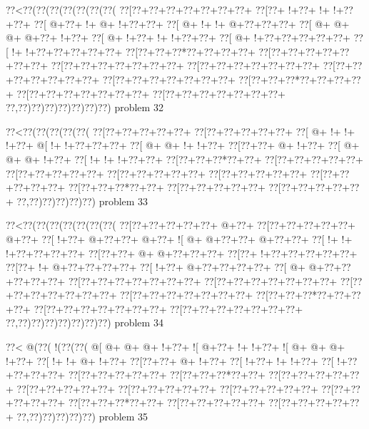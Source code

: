 \vbox{\vbox{\goo
\0??<\0??(\0??(\0??(\0??(\0??(\0??(\0??(
\0??[\0??+\0??+\0??+\0??+\0??+\0??+\0??+
\0??[\0??+\- !+\0??+\- !+\- !+\0??+\0??+
\0??[\- @+\0??+\- !+\- @+\- !+\0??+\0??+
\0??[\- @+\- !+\- !+\- @+\0??+\0??+\0??+
\0??[\- @+\- @+\- @+\- @+\0??+\- !+\0??+
\0??[\- @+\- !+\0??+\- !+\- !+\0??+\0??+
\0??[\- @+\- !+\0??+\0??+\0??+\0??+\0??+
\0??[\- !+\- !+\0??+\0??+\0??+\0??+\0??+
\0??[\0??+\0??+\0??*\0??+\0??+\0??+\0??+
\0??[\0??+\0??+\0??+\0??+\0??+\0??+\0??+
\0??[\0??+\0??+\0??+\0??+\0??+\0??+\0??+
\0??[\0??+\0??+\0??+\0??+\0??+\0??+\0??+
\0??[\0??+\0??+\0??+\0??+\0??+\0??+\0??+
\0??[\0??+\0??+\0??+\0??+\0??+\0??+\0??+
\0??[\0??+\0??+\0??*\0??+\0??+\0??+\0??+
\0??[\0??+\0??+\0??+\0??+\0??+\0??+\0??+
\0??[\0??+\0??+\0??+\0??+\0??+\0??+\0??+
\0??,\0??)\0??)\0??)\0??)\0??)\0??)\0??)
}
\hfil problem 32\hfil\break
}

\vbox{\vbox{\goo
\0??<\0??(\0??(\0??(\0??(\0??(
\0??[\0??+\0??+\0??+\0??+\0??+
\0??[\0??+\0??+\0??+\0??+\0??+
\0??[\- @+\- !+\- !+\- !+\0??+
\- @[\- !+\- !+\0??+\0??+\0??+
\0??[\- @+\- @+\- !+\- !+\0??+
\0??[\0??+\0??+\- @+\- !+\0??+
\0??[\- @+\- @+\- @+\- !+\0??+
\0??[\- !+\- !+\- !+\0??+\0??+
\0??[\0??+\0??+\0??*\0??+\0??+
\0??[\0??+\0??+\0??+\0??+\0??+
\0??[\0??+\0??+\0??+\0??+\0??+
\0??[\0??+\0??+\0??+\0??+\0??+
\0??[\0??+\0??+\0??+\0??+\0??+
\0??[\0??+\0??+\0??+\0??+\0??+
\0??[\0??+\0??+\0??*\0??+\0??+
\0??[\0??+\0??+\0??+\0??+\0??+
\0??[\0??+\0??+\0??+\0??+\0??+
\0??,\0??)\0??)\0??)\0??)\0??)
}
\hfil problem 33\hfil\break
}

\vbox{\vbox{\goo
\0??<\0??(\0??(\0??(\0??(\0??(\0??(\0??(
\0??[\0??+\0??+\0??+\0??+\0??+\- @+\0??+
\0??[\0??+\0??+\0??+\0??+\0??+\- @+\0??+
\0??[\- !+\0??+\- @+\0??+\0??+\- @+\0??+
\- ![\- @+\- @+\0??+\0??+\- @+\0??+\0??+
\0??[\- !+\- !+\- !+\0??+\0??+\0??+\0??+
\0??[\0??+\0??+\- @+\- @+\0??+\0??+\0??+
\0??[\0??+\- !+\0??+\0??+\0??+\0??+\0??+
\0??[\0??+\- !+\- @+\0??+\0??+\0??+\0??+
\0??[\- !+\0??+\- @+\0??+\0??+\0??+\0??+
\0??[\- @+\- @+\0??+\0??+\0??+\0??+\0??+
\0??[\0??+\0??+\0??+\0??+\0??+\0??+\0??+
\0??[\0??+\0??+\0??+\0??+\0??+\0??+\0??+
\0??[\0??+\0??+\0??+\0??+\0??+\0??+\0??+
\0??[\0??+\0??+\0??+\0??+\0??+\0??+\0??+
\0??[\0??+\0??+\0??*\0??+\0??+\0??+\0??+
\0??[\0??+\0??+\0??+\0??+\0??+\0??+\0??+
\0??[\0??+\0??+\0??+\0??+\0??+\0??+\0??+
\0??,\0??)\0??)\0??)\0??)\0??)\0??)\0??)
}
\hfil problem 34\hfil\break
}

\vbox{\vbox{\goo
\0??<\- @(\0??(\- !(\0??(\0??(
\- @[\- @+\- @+\- @+\- !+\0??+
\- ![\- @+\0??+\- !+\- !+\0??+
\- ![\- @+\- @+\- @+\- !+\0??+
\0??[\- !+\- !+\- @+\- !+\0??+
\0??[\0??+\0??+\- @+\- !+\0??+
\0??[\- !+\0??+\- !+\- !+\0??+
\0??[\- !+\0??+\0??+\0??+\0??+
\0??[\0??+\0??+\0??+\0??+\0??+
\0??[\0??+\0??+\0??*\0??+\0??+
\0??[\0??+\0??+\0??+\0??+\0??+
\0??[\0??+\0??+\0??+\0??+\0??+
\0??[\0??+\0??+\0??+\0??+\0??+
\0??[\0??+\0??+\0??+\0??+\0??+
\0??[\0??+\0??+\0??+\0??+\0??+
\0??[\0??+\0??+\0??*\0??+\0??+
\0??[\0??+\0??+\0??+\0??+\0??+
\0??[\0??+\0??+\0??+\0??+\0??+
\0??,\0??)\0??)\0??)\0??)\0??)
}
\hfil problem 35\hfil\break
}


